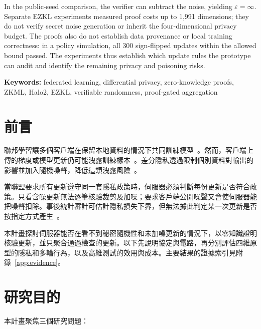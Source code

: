 \documentclass[12pt,a4paper]{article}
\newcommand{\eps}{\varepsilon}
\begin{document}
In the public-seed comparison, the verifier can subtract the noise, yielding $\eps=\infty$. Separate EZKL experiments measured proof costs up to 1,991 dimensions; they do not verify secret noise generation or inherit the four-dimensional privacy budget. The proofs also do not establish data provenance or local training correctness: in a policy simulation, all 300 sign-flipped updates within the allowed bound passed. The experiments thus establish which update rules the prototype can audit and identify the remaining privacy and poisoning risks.

\noindent\textbf{Keywords:} federated learning, differential privacy, zero-knowledge proofs, ZKML, Halo2, EZKL, verifiable randomness, proof-gated aggregation

\clearpage
{}

\section{前言}
聯邦學習讓多個客戶端在保留本地資料的情況下共同訓練模型~\cite{mcmahan2017fedavg}。然而，客戶端上傳的梯度或模型更新仍可能洩露訓練樣本~\cite{zhu2019deep,geiping2020inverting}。差分隱私透過限制個別資料對輸出的影響並加入隨機噪聲，降低這類洩露風險~\cite{dwork2014algorithmic,abadi2016dp}。

當聯盟要求所有更新遵守同一套隱私政策時，伺服器必須判斷每份更新是否符合政策。只看含噪更新無法逐筆核驗裁剪及加噪；要求客戶端公開噪聲又會使伺服器能把噪聲扣除。事後統計審計可估計隱私損失下界，但無法據此判定某一次更新是否按指定方式產生~\cite{nasr2023tight}。

本計畫探討伺服器能否在看不到秘密隨機性和未加噪更新的情況下，以零知識證明核驗更新，並只聚合通過檢查的更新。以下先說明協定與電路，再分別評估四維原型的隱私和多輪行為，以及高維測試的效用與成本。主要結果的證據索引見附錄~\ref{app:evidence}。

\section{研究目的}
本計畫聚焦三個研究問題：
\end{document}
